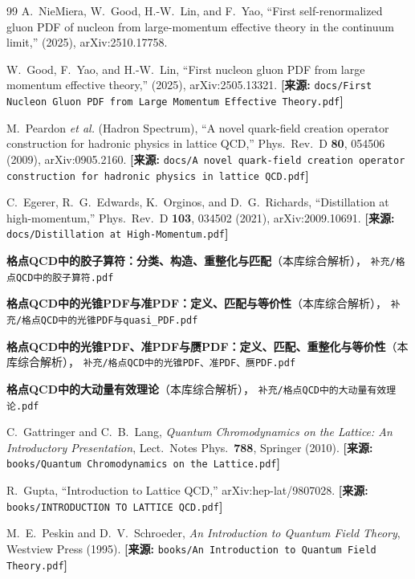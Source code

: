 \documentclass[12pt,a4paper]{ctexart}
\theoremstyle{definition}
\begin{document}
\begin{thebibliography}{99}
A.~NieMiera, W.~Good, H.-W.~Lin, and F.~Yao,
``First self-renormalized gluon PDF of nucleon from large-momentum effective theory in the continuum limit,''
(2025), arXiv:2510.17758.

W.~Good, F.~Yao, and H.-W.~Lin,
``First nucleon gluon PDF from large momentum effective theory,''
(2025), arXiv:2505.13321.
\quad\textbf{[来源:} \texttt{docs/First Nucleon Gluon PDF from Large Momentum Effective Theory.pdf}\textbf{]}

M.~Peardon \textit{et al.} (Hadron Spectrum),
``A novel quark-field creation operator construction for hadronic physics in lattice QCD,''
Phys.\ Rev.\ D \textbf{80}, 054506 (2009), arXiv:0905.2160.
\quad\textbf{[来源:} \texttt{docs/A novel quark-field creation operator construction for hadronic physics in lattice QCD.pdf}\textbf{]}

C.~Egerer, R.~G.~Edwards, K.~Orginos, and D.~G.~Richards,
``Distillation at high-momentum,''
Phys.\ Rev.\ D \textbf{103}, 034502 (2021), arXiv:2009.10691.
\quad\textbf{[来源:} \texttt{docs/Distillation at High-Momentum.pdf}\textbf{]}

\textbf{格点QCD中的胶子算符：分类、构造、重整化与匹配}（本库综合解析），
\texttt{补充/格点QCD中的胶子算符.pdf}

\textbf{格点QCD中的光锥PDF与准PDF：定义、匹配与等价性}（本库综合解析），
\texttt{补充/格点QCD中的光锥PDF与quasi\_PDF.pdf}

\textbf{格点QCD中的光锥PDF、准PDF与赝PDF：定义、匹配、重整化与等价性}（本库综合解析），
\texttt{补充/格点QCD中的光锥PDF、准PDF、赝PDF.pdf}

\textbf{格点QCD中的大动量有效理论}（本库综合解析），
\texttt{补充/格点QCD中的大动量有效理论.pdf}

C.~Gattringer and C.~B.~Lang,
\textit{Quantum Chromodynamics on the Lattice: An Introductory Presentation},
Lect.\ Notes Phys.\ \textbf{788}, Springer (2010).
\quad\textbf{[来源:} \texttt{books/Quantum Chromodynamics on the Lattice.pdf}\textbf{]}

R.~Gupta,
``Introduction to Lattice QCD,''
arXiv:hep-lat/9807028.
\quad\textbf{[来源:} \texttt{books/INTRODUCTION TO LATTICE QCD.pdf}\textbf{]}

M.~E.~Peskin and D.~V.~Schroeder,
\textit{An Introduction to Quantum Field Theory},
Westview Press (1995).
\quad\textbf{[来源:} \texttt{books/An Introduction to Quantum Field Theory.pdf}\textbf{]}

\end{thebibliography}
\end{document}
